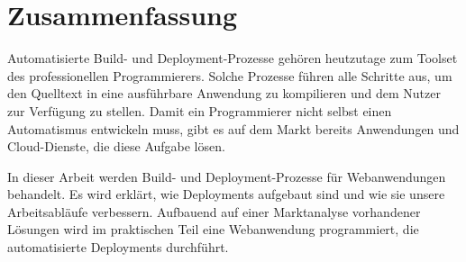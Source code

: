 \chapter*{Zusammenfassung}

Automatisierte Build- und Deployment-Prozesse gehören heutzutage zum Toolset des professionellen Programmierers. Solche Prozesse führen alle Schritte aus, um den Quelltext in eine ausführbare Anwendung zu kompilieren und dem Nutzer zur Verfügung zu stellen. Damit ein Programmierer nicht selbst einen Automatismus entwickeln muss, gibt es auf dem Markt bereits Anwendungen und Cloud-Dienste, die diese Aufgabe lösen.

In dieser Arbeit werden Build- und Deployment-Prozesse für Webanwendungen behandelt. Es wird erklärt, wie Deployments aufgebaut sind und wie sie unsere Arbeitsabläufe verbessern. Aufbauend auf einer Marktanalyse vorhandener Lösungen wird im praktischen Teil eine Webanwendung programmiert, die automatisierte Deployments durchführt.
